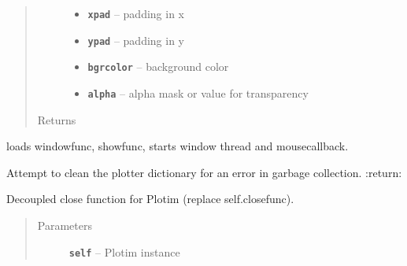 \documentclass[letterpaper,10pt,english]{sphinxmanual}
\begin{document}
\begin{fulllineitems}
\begin{fulllineitems}
\begin{quote}
\begin{description}
\begin{itemize}
\begin{itemize}
\end{itemize}


\item {} 
\textbf{\texttt{xpad}} -- padding in x

\item {} 
\textbf{\texttt{ypad}} -- padding in y

\item {} 
\textbf{\texttt{bgrcolor}} -- background color

\item {} 
\textbf{\texttt{alpha}} -- alpha mask or value for transparency

\end{itemize}

\item[{Returns}] \leavevmode


\end{description}\end{quote}

\end{fulllineitems}


\begin{fulllineitems}
\label{RRtoolbox.lib:RRtoolbox.lib.plotter.Plotim.builtinwindow}
loads windowfunc, showfunc, starts window thread and mousecallback.

\end{fulllineitems}


\begin{fulllineitems}
\label{RRtoolbox.lib:RRtoolbox.lib.plotter.Plotim.clean}
Attempt to clean the plotter dictionary for an error in
garbage collection.
:return:

\end{fulllineitems}


\begin{fulllineitems}
\label{RRtoolbox.lib:RRtoolbox.lib.plotter.Plotim.closefunc}
Decoupled close function for Plotim (replace self.closefunc).
\begin{quote}\begin{description}
\item[{Parameters}] \leavevmode
\textbf{\texttt{self}} -- Plotim instance


\end{description}
\end{quote}
\end{fulllineitems}
\end{fulllineitems}
\end{document}
